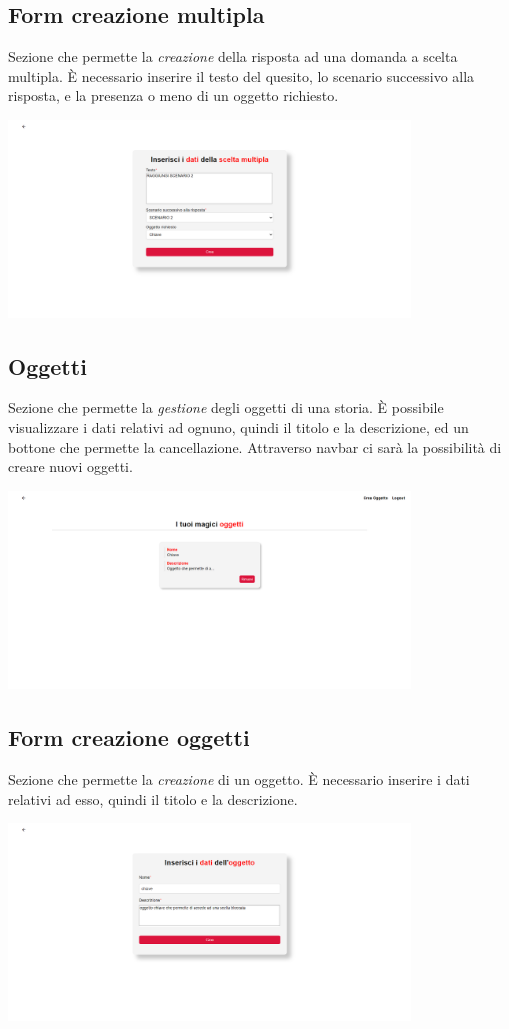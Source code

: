 \documentclass{article}
\begin{document}
\subsection*{Form creazione multipla}
Sezione che permette la \textit{creazione} della risposta ad una domanda a scelta multipla. È necessario inserire il testo del quesito, lo scenario successivo alla risposta, e la presenza o meno di un oggetto richiesto.
\begin{center}
    \includegraphics[width=0.8\textwidth]{foto18.png}
\end{center}

\subsection*{Oggetti}
Sezione che permette la \textit{gestione} degli oggetti di una storia. È possibile visualizzare i dati relativi ad ognuno, quindi il titolo e la descrizione, ed un bottone che permette la cancellazione. Attraverso navbar ci sarà la possibilità di creare nuovi oggetti.
\begin{center}
    \includegraphics[width=0.8\textwidth]{foto19.png}
\end{center}

\subsection*{Form creazione oggetti}
Sezione che permette la \textit{creazione} di un oggetto. È necessario inserire i dati relativi ad esso, quindi il titolo e la descrizione.
\begin{center}
    \includegraphics[width=0.8\textwidth]{foto20.png}
\end{center}
\end{document}
